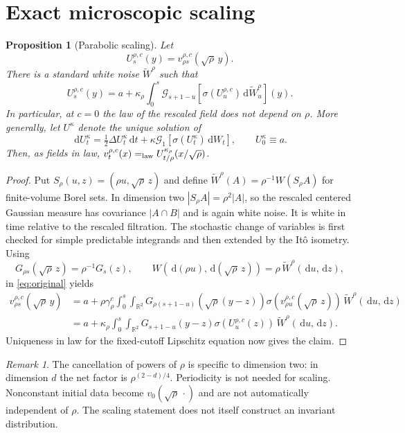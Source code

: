 \documentclass[11pt]{article}
\numberwithin{equation}{section}
\newtheorem{proposition}[theorem]{Proposition}
\theoremstyle{definition}
\theoremstyle{remark}
\newtheorem{remark}[theorem]{Remark}
\newcommand{\R}{\mathbb R}
\newcommand{\clG}{\mathcal G}
\newcommand{\dd}{\,\mathrm d}
\begin{document}
\section{Exact microscopic scaling}
\begin{proposition}[Parabolic scaling]\label{prop:scaling}
Let
\[
 U_s^{\rho,c}(y)=v_{\rho s}^{\rho,c}(\sqrt\rho\,y).
\]
There is a standard white noise $\widetilde W^\rho$ such that
\begin{equation}\label{eq:micro}
 U_s^{\rho,c}(y)=a+\kappa_\rho\int_0^s
 \clG_{s+1-u}[\sigma(U_u^{\rho,c})\dd\widetilde W^\rho_u](y).
\end{equation}
In particular, at $c=0$ the law of the rescaled field does not depend on $\rho$. More generally, let $U^\kappa$ denote the unique solution of
\begin{equation}\label{eq:U}
 \dd U_t^\kappa=\tfrac12\Delta U_t^\kappa\dd t+
 \kappa\clG_1[\sigma(U_t^\kappa)\dd W_t],\qquad U_0^\kappa\equiv a.
\end{equation}
Then, as fields in law, $v_t^{\rho,c}(x)=_{\rm law}U_{t/\rho}^{\kappa_\rho}(x/\sqrt\rho)$.
\end{proposition}
\begin{proof}
Put $S_\rho(u,z)=(\rho u,\sqrt\rho\,z)$ and define $\widetilde W^\rho(A)=\rho^{-1}W(S_\rho A)$ for finite-volume Borel sets. In dimension two $|S_\rho A|=\rho^2|A|$, so the rescaled centered Gaussian measure has covariance $|A\cap B|$ and is again white noise. It is white in time relative to the rescaled filtration. The stochastic change of variables is first checked for simple predictable integrands and then extended by the It\^o isometry. Using
\[
 G_{\rho s}(\sqrt\rho\,z)=\rho^{-1}G_s(z),
 \qquad W(\dd(\rho u),\dd(\sqrt\rho\,z))=\rho\,\widetilde W^\rho(\dd u,\dd z),
\]
in \eqref{eq:original} yields
\begin{align*}
 v_{\rho s}^{\rho,c}(\sqrt\rho\,y)
 &=a+\rho\gamma_\rho^c\int_0^s\int_{\R^2}
 G_{\rho(s+1-u)}(\sqrt\rho(y-z))\sigma(v_{\rho u}^{\rho,c}(\sqrt\rho\,z))
 \,\widetilde W^\rho(\dd u,\dd z)\\
 &=a+\kappa_\rho\int_0^s\int_{\R^2}G_{s+1-u}(y-z)
 \sigma(U_u^{\rho,c}(z))\,\widetilde W^\rho(\dd u,\dd z).
\end{align*}
Uniqueness in law for the fixed-cutoff Lipschitz equation now gives the claim.
\end{proof}
\begin{remark}
The cancellation of powers of $\rho$ is specific to dimension two: in dimension $d$ the net factor is $\rho^{(2-d)/4}$. Periodicity is not needed for scaling. Nonconstant initial data become $v_0(\sqrt\rho\,\cdot)$ and are not automatically independent of $\rho$. The scaling statement does not itself construct an invariant distribution.
\end{remark}
\end{document}
